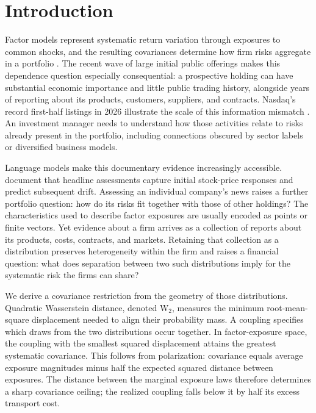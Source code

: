 \section{Introduction}\label{sec:introduction}

Factor models represent systematic return variation through exposures to
common shocks, and the resulting covariances determine how firm risks
aggregate in a portfolio
\citep{ross_arbitrage_1976,fama_multifactor_1996,daniel_evidence_1997}.
The recent wave of large initial public offerings makes this dependence
question especially consequential: a prospective holding can have substantial
economic importance and little public trading history, alongside years of
reporting about its products, customers, suppliers, and contracts.
Nasdaq's record first-half listings in 2026 illustrate the scale of this
information mismatch \citep{nasdaq_listings_2026}.
An investment manager needs to understand how those activities relate to risks
already present in the portfolio, including connections obscured by sector
labels or diversified business models.

Language models make this documentary evidence increasingly accessible.
\citet{lopezlira_chatgpt_2026} document that headline assessments capture
initial stock-price responses and predict subsequent drift.
Assessing an individual company's news raises a further portfolio question:
how do its risks fit together with those of other holdings?
The characteristics used to describe factor exposures are usually encoded as
points or finite vectors.
Yet evidence about a firm arrives as a collection of reports about its
products, costs, contracts, and markets.
Retaining that collection as a distribution preserves heterogeneity within
the firm and raises a financial question: what does separation between two
such distributions imply for the systematic risk the firms can share?

We derive a covariance restriction from the geometry of those distributions.
Quadratic Wasserstein distance, denoted W$_2$, measures the minimum
root-mean-square displacement needed to align their probability mass.
A coupling specifies which draws from the two distributions occur together.
In factor-exposure space, the coupling with the smallest squared displacement
attains the greatest systematic covariance.
This follows from polarization: covariance equals average exposure magnitudes
minus half the expected squared distance between exposures.
The distance between the marginal exposure laws therefore determines a sharp
covariance ceiling; the realized coupling falls below it by half its excess
transport cost.

